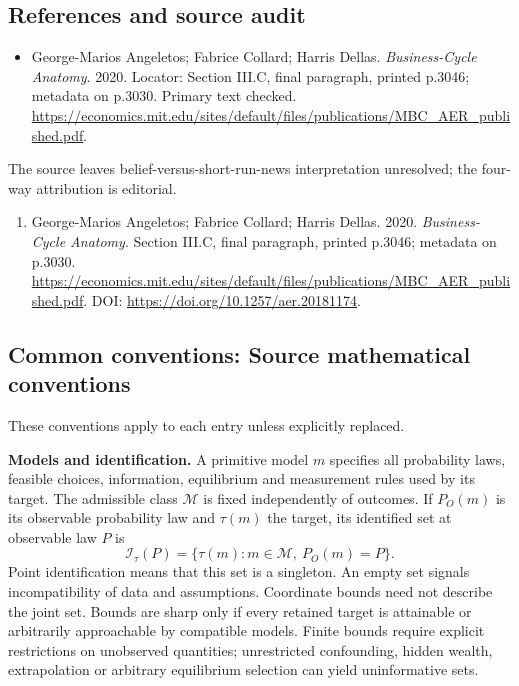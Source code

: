 \documentclass[11pt,a4paper]{article}
\begin{document}
\subsection*{References and source audit}
\begin{itemize}
\item George-Marios Angeletos; Fabrice Collard; Harris Dellas. \emph{Business-Cycle Anatomy}. 2020. Locator: Section III.C, final paragraph, printed p.3046; metadata on p.3030. Primary text checked. \url{https://economics.mit.edu/sites/default/files/publications/MBC_AER_published.pdf}.
\end{itemize}
The source leaves belief-versus-short-run-news interpretation unresolved; the four-way attribution is editorial.
\begin{enumerate}\raggedright
\item\hypertarget{definitions:source:30007512:1}{} George-Marios Angeletos; Fabrice Collard; Harris Dellas. 2020. \emph{Business-Cycle Anatomy}. Section III.C, final paragraph, printed p.3046; metadata on p.3030.
\url{https://economics.mit.edu/sites/default/files/publications/MBC_AER_published.pdf}.
DOI: \url{https://doi.org/10.1257/aer.20181174}.
\end{enumerate}

\subsection*{Common conventions: Source mathematical conventions}

These conventions apply to each entry unless explicitly replaced.

\textbf{Models and identification.} A primitive model \(m\) specifies all probability laws, feasible choices, information, equilibrium and measurement rules used by its target. The admissible class \(\mathcal M\) is fixed independently of outcomes. If \(P_O(m)\) is its observable probability law and \(\tau(m)\) the target, its identified set at observable law \(P\) is
\[
 \mathcal I_\tau(P)=\{\tau(m):m\in\mathcal M,\ P_O(m)=P\}.
\]
Point identification means that this set is a singleton. An empty set signals incompatibility of data and assumptions. Coordinate bounds need not describe the joint set. Bounds are sharp only if every retained target is attainable or arbitrarily approachable by compatible models. Finite bounds require explicit restrictions on unobserved quantities; unrestricted confounding, hidden wealth, extrapolation or arbitrary equilibrium selection can yield uninformative sets.
\end{document}
